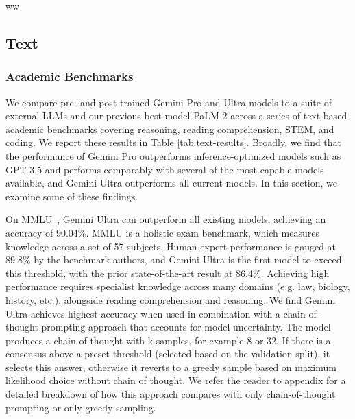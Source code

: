 ww\subsection{Text}

\subsubsection{Academic Benchmarks}
\label{sec:benchmarks}
We compare pre- and post-trained Gemini Pro and Ultra models to a suite of external LLMs and our previous best model PaLM 2 across a series of text-based academic benchmarks covering reasoning, reading comprehension, STEM, and coding. We report these results in Table \ref{tab:text-results}. Broadly, we find that the performance of Gemini Pro outperforms inference-optimized models such as GPT-3.5 and performs comparably with several of the most capable models available, and Gemini Ultra outperforms all current models. In this section, we examine some of these findings.

On MMLU~\cite{mmlu}, Gemini Ultra can outperform all existing models, achieving an accuracy of 90.04\%. MMLU is a holistic exam benchmark, which measures knowledge across a set of 57 subjects. Human expert performance is gauged at 89.8\% by the benchmark authors, and Gemini Ultra is the first model to exceed this threshold, with the prior state-of-the-art result at 86.4\%. Achieving high performance requires specialist knowledge across many domains (e.g. law, biology, history, etc.), alongside reading comprehension and reasoning. We find Gemini Ultra achieves highest accuracy when used in combination with a chain-of-thought prompting approach \cite{wei2022chain} that accounts for model uncertainty. The model produces a chain of thought with k samples, for example 8 or 32. If there is a consensus above a preset threshold (selected based on the validation split), it selects this answer, otherwise it reverts to a greedy sample based on maximum likelihood choice without chain of thought. We refer the reader to appendix for a detailed breakdown of how this approach compares with only chain-of-thought prompting or only greedy sampling. 

